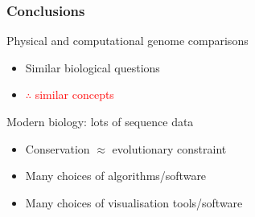 %
\begin{frame}
  \frametitle{Conclusions}
  \textcolor{RawSienna}{Physical and computational genome comparisons} \\
  \begin{itemize}
    \item Similar biological questions
    \item \textcolor{red}{$\therefore$ similar concepts}
  \end{itemize}  
  \textcolor{hutton_green}{Modern biology: lots of sequence data}
  \begin{itemize}
    \item Conservation $\approx$ evolutionary constraint
    \item \textcolor{hutton_blue}{Many choices of algorithms/software}
    \item \textcolor{hutton_purple}{Many choices of visualisation tools/software}
  \end{itemize}  
\end{frame}


